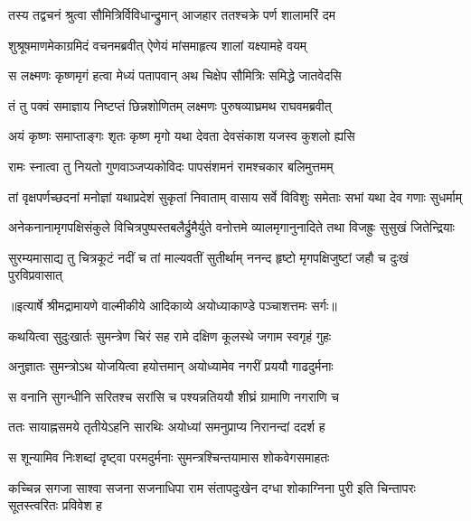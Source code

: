 \twolineshloka
{तस्य तद्वचनं श्रुत्वा सौमित्रिर्विविधान्द्रुमान्}
{आजहार ततश्चक्रे पर्ण शालामरिं दम} %

\twolineshloka
{शुश्रूषमाणमेकाग्रमिदं वचनमब्रवीत्}
{ऐणेयं मांसमाहृत्य शालां यक्ष्यामहे वयम्} %

\twolineshloka
{स लक्ष्मणः कृष्णमृगं हत्वा मेध्यं पतापवान्}
{अथ चिक्षेप सौमित्रिः समिद्धे जातवेदसि} %

\twolineshloka
{तं तु पक्वं समाज्ञाय निष्टप्तं छिन्नशोणितम्}
{लक्ष्मणः पुरुषव्याघ्रमथ राघवमब्रवीत्} %

\twolineshloka
{अयं कृष्णः समाप्ताङ्गः शृतः कृष्ण मृगो यथा}
{देवता देवसंकाश यजस्व कुशलो ह्यसि} %

\twolineshloka
{रामः स्नात्वा तु नियतो गुणवाञ्जप्यकोविदः}
{पापसंशमनं रामश्चकार बलिमुत्तमम्} %

\fourlineindentedshloka
{तां वृक्षपर्णच्छदनां मनोज्ञां}
{ यथाप्रदेशं सुकृतां निवाताम्}
{वासाय सर्वे विविशुः समेताः}
{ सभां यथा देव गणाः सुधर्माम्} %

\fourlineindentedshloka
{अनेकनानामृगपक्षिसंकुले}
{ विचित्रपुष्पस्तबलैर्द्रुमैर्युते}
{वनोत्तमे व्यालमृगानुनादिते}
{ तथा विजह्रुः सुसुखं जितेन्द्रियाः} %

\fourlineindentedshloka
{सुरम्यमासाद्य तु चित्रकूटं}
{ नदीं च तां माल्यवतीं सुतीर्थाम्}
{ननन्द हृष्टो मृगपक्षिजुष्टां}
{ जहौ च दुःखं पुरविप्रवासात्} %


{॥इत्यार्षे श्रीमद्रामायणे वाल्मीकीये आदिकाव्ये अयोध्याकाण्डे पञ्चाशत्तमः सर्गः॥}


\twolineshloka
{कथयित्वा सुदुःखार्तः सुमन्त्रेण चिरं सह}
{रामे दक्षिण कूलस्थे जगाम स्वगृहं गुहः} %

\twolineshloka
{अनुज्ञातः सुमन्त्रोऽथ योजयित्वा हयोत्तमान्}
{अयोध्यामेव नगरीं प्रययौ गाढदुर्मनाः} %

\twolineshloka
{स वनानि सुगन्धीनि सरितश्च सरांसि च}
{पश्यन्नतिययौ शीघ्रं ग्रामाणि नगराणि च} %

\twolineshloka
{ततः सायाह्नसमये तृतीयेऽहनि सारथिः}
{अयोध्यां समनुप्राप्य निरानन्दां ददर्श ह} %

\twolineshloka
{स शून्यामिव निःशब्दां दृष्ट्वा परमदुर्मनाः}
{सुमन्त्रश्चिन्तयामास शोकवेगसमाहतः} %

\threelineshloka
{कच्चिन्न सगजा साश्वा सजना सजनाधिपा}
{राम संतापदुःखेन दग्धा शोकाग्निना पुरी}
{इति चिन्तापरः सूतस्त्वरितः प्रविवेश ह} %

